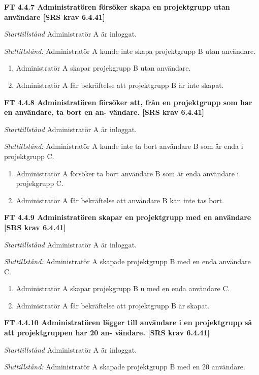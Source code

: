 \documentclass[a4paper]{article}
\begin{document}
\textbf{FT 4.4.7 Administratören försöker skapa en projektgrupp utan användare [SRS krav 6.4.41]}

\emph{Starttillstånd} Administratör A är inloggat.

\emph{Sluttillstånd:} Administratör A kunde inte skapa  projektgrupp B utan användare.

\begin{enumerate}
\item Administratör A skapar projekgrupp B utan användare.
\item Administratör A får bekräftelse att projektgrupp B är inte skapat.
\end{enumerate}

\textbf{FT 4.4.8 Administratören försöker att, från en projektgrupp som har en användare, ta bort en an- vändare. [SRS krav 6.4.41]}

\emph{Starttillstånd} Administratör A är inloggat.

\emph{Sluttillstånd:} Administratör A kunde inte ta bort användare B som är enda i  projektgrupp C.

\begin{enumerate}
\item Administratör A försöker ta bort  användare B som är enda användare i projekgrupp C.
\item Administratör A får bekräftelse att användare B  kan inte tas bort.
\end{enumerate}

\textbf{FT 4.4.9 Administratören skapar en projektgrupp med en användare [SRS krav 6.4.41]}

\emph{Starttillstånd} Administratör A är inloggat. 

\emph{Sluttillstånd:} Administratör A  skapade  projektgrupp B med en enda  användare C.

\begin{enumerate}
\item Administratör A skapar projekgrupp B u med en enda  användare C.
\item Administratör A får bekräftelse att projektgrupp B är skapat.
\end{enumerate}

\textbf{FT 4.4.10 Administratören lägger till användare i en projektgrupp så att projektgruppen har 20 an- vändare. [SRS krav 6.4.41]}

\emph{Starttillstånd} Administratör A är inloggat.

\emph{Sluttillstånd:} Administratör A  skapade  projektgrupp B med en 20  användare.
\end{document}
